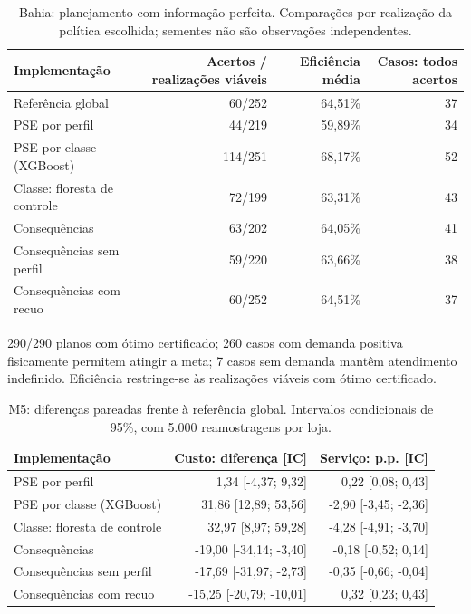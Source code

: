 \begin{table}[htbp]\centering\small
\caption{Bahia: planejamento com informação perfeita. Comparações por realização da política escolhida; sementes não são observações independentes.}
\label{tab:unificado_teorico_ba}
\begin{tabular}{@{}p{4.4cm}rrr@{}}\toprule
Implementação & Acertos / realizações viáveis & Eficiência média & Casos: todos acertos\\\midrule
Referência global & 60/252 & 64,51\% & 37\\
PSE por perfil & 44/219 & 59,89\% & 34\\
PSE por classe (XGBoost) & 114/251 & 68,17\% & 52\\
Classe: floresta de controle & 72/199 & 63,31\% & 43\\
Consequências & 63/202 & 64,05\% & 41\\
Consequências sem perfil & 59/220 & 63,66\% & 38\\
Consequências com recuo & 60/252 & 64,51\% & 37\\
\bottomrule\end{tabular}
\par\footnotesize 290/290 planos com ótimo certificado; 260 casos com demanda positiva fisicamente permitem atingir a meta; 7 casos sem demanda mantêm atendimento indefinido. Eficiência restringe-se às realizações viáveis com ótimo certificado.
\end{table}
\begin{table}[htbp]\centering\small
\caption{M5: diferenças pareadas frente à referência global. Intervalos condicionais de 95\%, com 5.000 reamostragens por loja.}
\label{tab:unificado_delta_m5}
\begin{tabular}{@{}p{4.4cm}rr@{}}\toprule
Implementação & Custo: diferença [IC] & Serviço: p.p. [IC]\\\midrule
PSE por perfil & 1,34 [-4,37; 9,32] & 0,22 [0,08; 0,43]\\
PSE por classe (XGBoost) & 31,86 [12,89; 53,56] & -2,90 [-3,45; -2,36]\\
Classe: floresta de controle & 32,97 [8,97; 59,28] & -4,28 [-4,91; -3,70]\\
Consequências & -19,00 [-34,14; -3,40] & -0,18 [-0,52; 0,14]\\
Consequências sem perfil & -17,69 [-31,97; -2,73] & -0,35 [-0,66; -0,04]\\
Consequências com recuo & -15,25 [-20,79; -10,01] & 0,32 [0,23; 0,43]\\
\bottomrule\end{tabular}\end{table}
